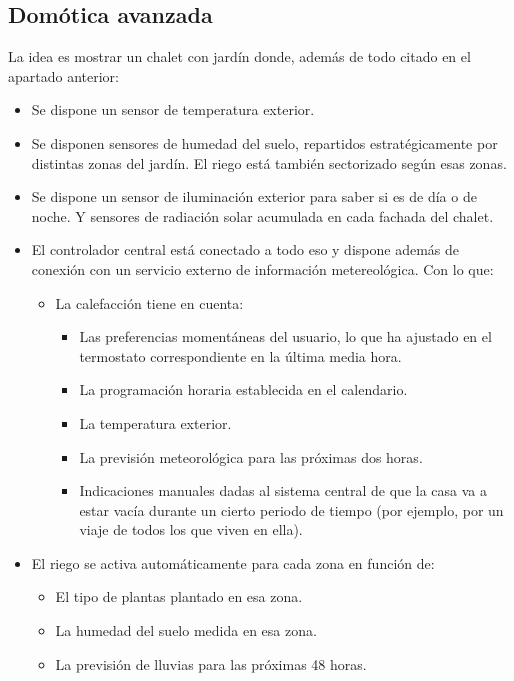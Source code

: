 \documentclass[spanish,10pt,a4paper,final,oneside]{article}
\begin{document}
\subsection{Domótica avanzada}

La idea es mostrar un chalet con jardín donde, además de todo citado en el apartado anterior:
\begin{itemize}
\item Se dispone un sensor de temperatura exterior.
\item Se disponen sensores de humedad del suelo, repartidos estratégicamente por distintas zonas del jardín. El riego está también sectorizado según esas zonas.
\item Se dispone un sensor de iluminación exterior para saber si es de día o de noche. Y sensores de radiación solar acumulada en cada fachada del chalet.
\item El controlador central está conectado a todo eso y dispone además de conexión con un servicio externo de información metereológica. Con lo que:

\begin{itemize}
\item La calefacción tiene en cuenta:
\begin{itemize}
\item Las preferencias momentáneas del usuario, lo que ha ajustado en el termostato correspondiente en la última media hora.
\item La programación horaria establecida en el calendario.
\item La temperatura exterior.
\item La previsión meteorológica para las próximas dos horas.
\item Indicaciones manuales dadas al sistema central de que la casa va a estar vacía durante un cierto periodo de tiempo (por ejemplo, por un viaje de todos los que viven en ella).
\end{itemize}
\end{itemize} 

\item El riego se activa automáticamente para cada zona en función de:
\begin{itemize}
\item El tipo de plantas plantado en esa zona.
\item La humedad del suelo medida en esa zona.
\item La previsión de lluvias para las próximas 48 horas.
\end{itemize}


\end{itemize}
\end{document}
